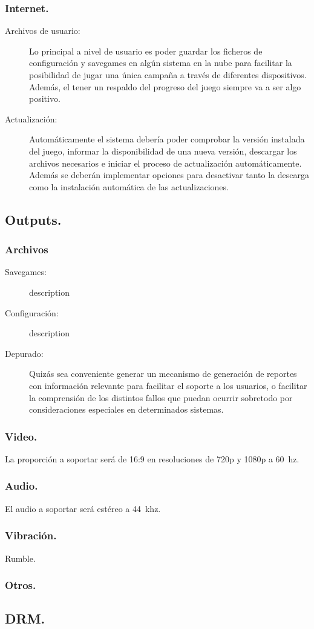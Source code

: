 \subsubsection{Internet.}
\begin{description}
\item[Archivos de usuario:] Lo principal a nivel de usuario es poder guardar los ficheros de configuración y savegames en algún sistema en la nube para facilitar la posibilidad de jugar una única campaña a través de diferentes dispositivos. Además, el tener un respaldo del progreso del juego siempre va a ser algo positivo.

\item[Actualización:] Automáticamente el sistema debería poder comprobar la versión instalada del juego, informar la disponibilidad de una nueva versión, descargar los archivos necesarios e iniciar el proceso de actualización automáticamente. Además se deberán implementar opciones para desactivar tanto la descarga como la instalación automática de las actualizaciones.
\end{description}

\subsection{Outputs.}

\subsubsection{Archivos}
\begin{description}
\item[Savegames:] description

\item[Configuración:] description

\item[Depurado:] Quizás sea conveniente generar un mecanismo de generación de reportes con información relevante para facilitar el soporte a los usuarios, o facilitar la comprensión de los distintos fallos que puedan ocurrir sobretodo por consideraciones especiales en determinados sistemas.
\end{description}


\subsubsection{Video.}
La proporción a soportar será de 16:9 en resoluciones de 720p y 1080p a 60~hz.

\subsubsection{Audio.}
El audio a soportar será estéreo a 44~khz.

\subsubsection{Vibración.}
Rumble.

\subsubsection{Otros.}

\subsection{DRM.}
